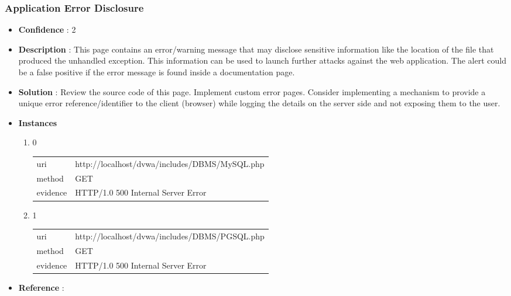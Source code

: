 \documentclass[10pt]{article}
\begin{document}
\subsubsection{Application Error Disclosure}
\begin{itemize}
\item[] \textbf{Confidence} : 2
\item[] \textbf{Description} : This page contains an error/warning message that may disclose sensitive information like the location of the file that produced the unhandled exception. This information can be used to launch further attacks against the web application. The alert could be a false positive if the error message is found inside a documentation page.
\item[] \textbf{Solution} :  Review the source code of this page. Implement custom error pages. Consider implementing a mechanism to provide a unique error reference/identifier to the client (browser) while logging the details on the server side and not exposing them to the user.
\item[] \textbf{Instances}
\begin{enumerate}
\item[] 0
\begin{tabular}{| l | p{14cm}}
uri & http://localhost/dvwa/includes/DBMS/MySQL.php \\
method & GET \\
evidence & HTTP/1.0 500 Internal Server Error \\
\end{tabular}
\item[] 1
\begin{tabular}{| l | p{14cm}}
uri & http://localhost/dvwa/includes/DBMS/PGSQL.php \\
method & GET \\
evidence & HTTP/1.0 500 Internal Server Error \\
\end{tabular}
\end{enumerate}
\item[] \textbf{Reference} : 
\end{itemize}
\end{document}
